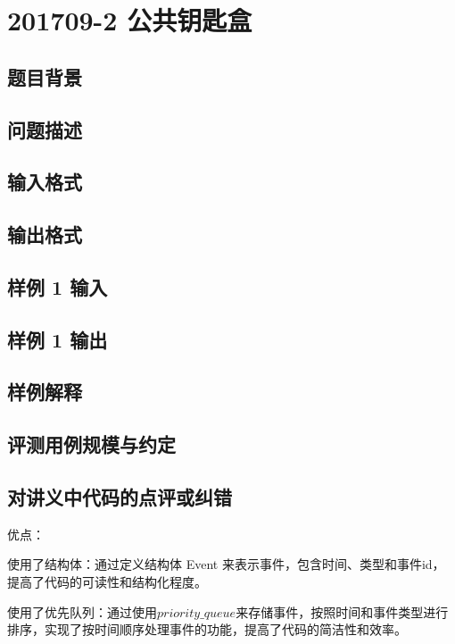 \section{201709-2 公共钥匙盒}

\subsection{题目背景}

\subsection{问题描述}

\subsection{输入格式}

\subsection{输出格式}

\subsection{样例 1 输入}

\subsection{样例 1 输出}

\subsection{样例解释}

\subsection{评测用例规模与约定}

\subsection{对讲义中代码的点评或纠错}
 
优点：

使用了结构体：通过定义结构体 Event 来表示事件，包含时间、类型和事件id，提高了代码的可读性和结构化程度。

使用了优先队列：通过使用$ priority\_queue $来存储事件，按照时间和事件类型进行排序，实现了按时间顺序处理事件的功能，提高了代码的简洁性和效率。

